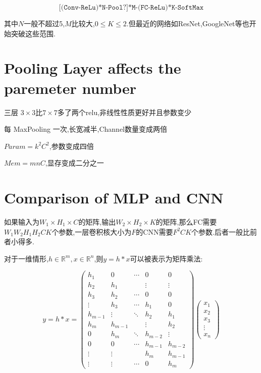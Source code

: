 \[\texttt{[(Conv-ReLu)*N-Pool?]*M-(FC-ReLu)*K-SoftMax}\]

其中$N$一般不超过5,$M$比较大,$0\le K \le 2$.但最近的网络如ResNet,GoogleNet等也开始突破这些范围.

\section{Pooling Layer affects the paremeter number}

三层 $3\times3$比$7\times7$多了两个relu,非线性性质更好并且参数变少

每 MaxPooling 一次,长宽减半,Channel数量变成两倍

$Param=k^2C^2$,参数变成四倍

$Mem=mnC$,显存变成二分之一

\section{Comparison of MLP and CNN}

如果输入为$W_1 \times H_1 \times C$的矩阵,输出$W_2 \times H_2 \times K$的矩阵,那么FC需要$W_1W_2H_1H_2CK$个参数,一层卷积核大小为$F$的CNN需要$F^2CK$个参数.后者一般比前者小得多.

对于一维情形,$h \in \mathbb R^m, x\in \mathbb R^n$,则$y = h * x$可以被表示为矩阵乘法:

\begin{equation}
	y=h * x=
	\begin{pmatrix}
		h_{1} & 0 & \cdots & 0 & 0 \\
		h_{2} & h_{1} & & \vdots & \vdots \\
		h_{3} & h_{2} & \cdots & 0 & 0 \\
		\vdots & h_{3} & \cdots & h_{1} & 0 \\
		h_{m-1} & \vdots & \ddots & h_{2} & h_{1} \\
		h_{m} & h_{m-1} & & \vdots & h_{2} \\
		0 & h_{m} & \ddots & h_{m-2} & \vdots \\
		0 & 0 & \cdots & h_{m-1} & h_{m-2} \\
		\vdots & \vdots & & h_{m} & h_{m-1}\\
		\vdots &\vdots & \cdots  &0 & h_{m}
	\end{pmatrix}
	\begin{pmatrix}
		x_{1} \\
		x_{2} \\
		x_{3} \\
		\vdots \\
		x_{n}
	\end{pmatrix}
\end{equation}


